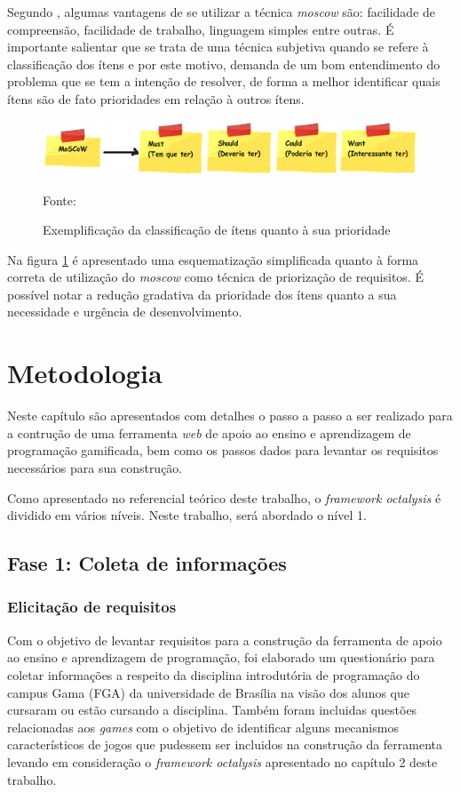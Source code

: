 Segundo , algumas vantagens de se utilizar a técnica \textit{moscow} são: facilidade de compreensão, facilidade de trabalho, linguagem simples
entre outras. É importante salientar que se trata de uma técnica subjetiva quando se refere à classificação dos ítens e por este motivo, demanda de um 
bom entendimento do problema que se tem a intenção de resolver, de forma a melhor identificar quais ítens são de fato prioridades em relação à outros ítens.

\begin{figure}[h]
	\centering
	\includegraphics[keepaspectratio=true,scale=0.75]{figuras/moscow.png}
	\caption{Exemplificação da classificação de ítens quanto à sua prioridade}
	Fonte: \cite{moscow}
	\label{moscow}
\end{figure}

Na figura \ref{moscow} é apresentado uma esquematização simplificada quanto à forma correta de utilização do \textit{moscow} como 
técnica de priorização de requisitos. É possível notar a redução gradativa da prioridade dos ítens quanto a sua necessidade
e urgência de desenvolvimento. 


\chapter{Metodologia}
Neste capítulo são apresentados com detalhes o passo a passo a ser realizado para a contrução de uma ferramenta \textit{web}
de apoio ao ensino e aprendizagem de programação gamificada, bem como os passos dados para levantar os requisitos necessários
para sua construção.

Como apresentado no referencial teórico deste trabalho, o \textit{framework octalysis} é dividido em vários níveis. Neste
trabalho, será abordado o nível 1. 

\section{Fase 1: Coleta de informações }

\subsection{Elicitação de requisitos}
Com o objetivo de levantar requisitos para a construção da ferramenta de apoio ao ensino e aprendizagem de 
programação, foi elaborado um questionário para coletar informações a respeito da disciplina introdutória de programação 
do campus Gama (FGA) da universidade de Brasília na visão dos alunos que cursaram ou estão cursando a disciplina. Também 
foram incluidas  questões relacionadas aos \textit{games} com o objetivo de identificar alguns mecanismos característicos
de jogos que pudessem ser incluidos na construção da ferramenta levando em consideração o  \textit{framework octalysis}
apresentado no capítulo 2 deste trabalho.

